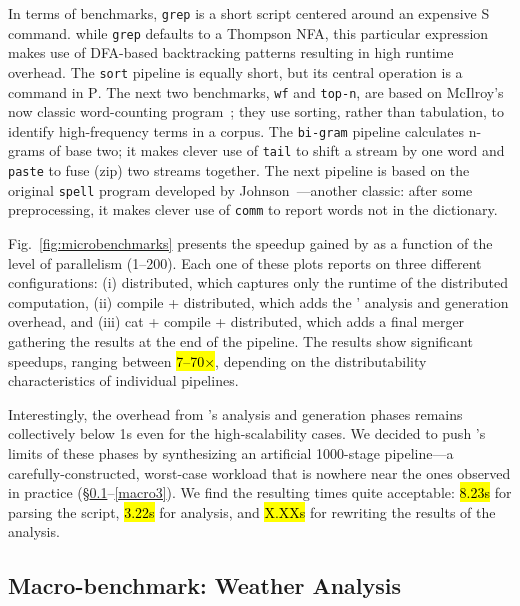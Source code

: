 \documentclass[sigplan,10pt,review,anonymous]{acmart}
\newcommand{\ttt}[1]{\texttt{\small #1}}
\newcommand{\cn}[1]{\mbox{\textcircled{\footnotesize #1}}}
\newcommand{\pur}{\cn{\textsc{P}}\xspace}
\newcommand{\sta}{\cn{\textsc{S}}\xspace}
\newcommand{\todo}[1]{\hl{#1}\xspace}
\newcommand{\nv}[1]{[{\color{cyan}#1 --- nv}]}
\begin{document}
In terms of benchmarks, \ttt{grep} is a short script centered around an expensive \sta command.
  while \ttt{grep} defaults to a Thompson NFA, this particular expression makes use of DFA-based backtracking patterns resulting in high runtime overhead.
The \ttt{sort} pipeline is equally short, but its central operation is a command in \pur.
The next two benchmarks, \ttt{wf} and \ttt{top-n}, are based on McIlroy's now classic word-counting program~\cite{bentley1986literate};
  they use sorting, rather than tabulation, to identify high-frequency terms in a corpus.
The \ttt{bi-gram} pipeline calculates n-grams of base two;
  it makes clever use of \ttt{tail} to shift a stream by one word and \ttt{paste} to fuse (zip) two streams together.
The next pipeline is based on the original \ttt{spell} program developed by Johnson~\cite{bentley1985spelling}---another \unix classic:
  after some preprocessing, it makes clever use of \ttt{comm} to report words not in the dictionary.

Fig.~\ref{fig:microbenchmarks} presents the speedup gained by \sys as a function of the level of parallelism (1--200).
Each one of these plots reports on three different configurations:
  (i) distributed, which captures only the runtime of the distributed computation,
  (ii) compile + distributed, which adds the \sys' analysis and generation overhead, and
  (iii) cat + compile + distributed, which adds a final merger  gathering the results at the end of the pipeline.
The results show significant speedups, ranging between \todo{7--70$\times$}, depending on the distributability characteristics of individual pipelines.

Interestingly, the overhead from \sys's analysis and generation phases remains collectively below 1s even for the high-scalability cases.
We decided to push \sys's limits of these phases by synthesizing an artificial 1000-stage pipeline---a carefully-constructed, worst-case workload that is nowhere near the ones observed in practice (\S\ref{macro1}--\ref{macro3}).
We find the resulting times quite acceptable:
  \todo{8.23s} for parsing the script, 
  \todo{3.22s} for analysis, and 
  \todo{X.XXs} for rewriting the results of the analysis.

\subsection{Macro-benchmark: Weather Analysis}
\label{macro1}
\end{document}
